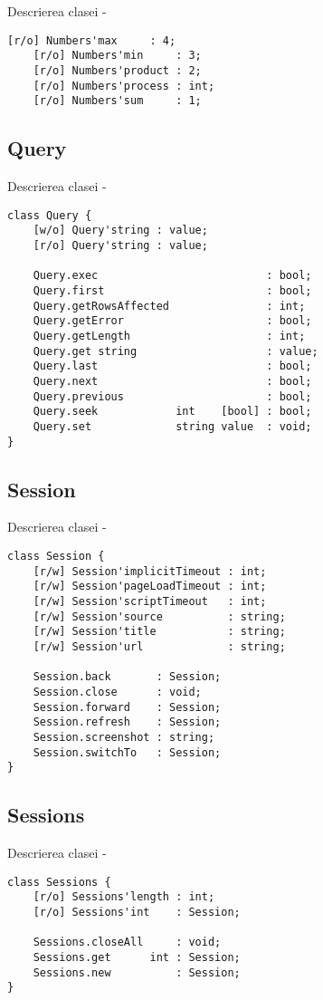 \noindent Descrierea clasei  -
\begin{lstlisting}[numbers=none]
	[r/o] Numbers'max     : 4;
	[r/o] Numbers'min     : 3;
	[r/o] Numbers'product : 2;
	[r/o] Numbers'process : int;
	[r/o] Numbers'sum     : 1;
\end{lstlisting}

\subsection{{\color{orange} Query}}

\noindent Descrierea clasei  -
\begin{lstlisting}[numbers=none]
class Query {
	[w/o] Query'string : value;
	[r/o] Query'string : value;
	
	Query.exec                          : bool;
	Query.first                         : bool;
	Query.getRowsAffected               : int;
	Query.getError                      : bool;
	Query.getLength                     : int;
	Query.get string                    : value;
	Query.last                          : bool;
	Query.next                          : bool;
	Query.previous                      : bool;
	Query.seek            int    [bool] : bool;
	Query.set             string value  : void;
}
\end{lstlisting}

\subsection{{\color{orange} Session}}

\noindent Descrierea clasei  -
\begin{lstlisting}[numbers=none]
class Session {
	[r/w] Session'implicitTimeout : int;
	[r/w] Session'pageLoadTimeout : int;
	[r/w] Session'scriptTimeout   : int;
	[r/w] Session'source          : string;
	[r/w] Session'title           : string;
	[r/w] Session'url             : string;
	
	Session.back       : Session;
	Session.close      : void;
	Session.forward    : Session;
	Session.refresh    : Session;
	Session.screenshot : string;
	Session.switchTo   : Session;
}
\end{lstlisting}

\subsection{{\color{orange} Sessions}}

\noindent Descrierea clasei  -
\begin{lstlisting}[numbers=none]
class Sessions {
	[r/o] Sessions'length : int;
	[r/o] Sessions'int    : Session;
	
	Sessions.closeAll     : void;
	Sessions.get      int : Session;
	Sessions.new          : Session;
}
\end{lstlisting}

